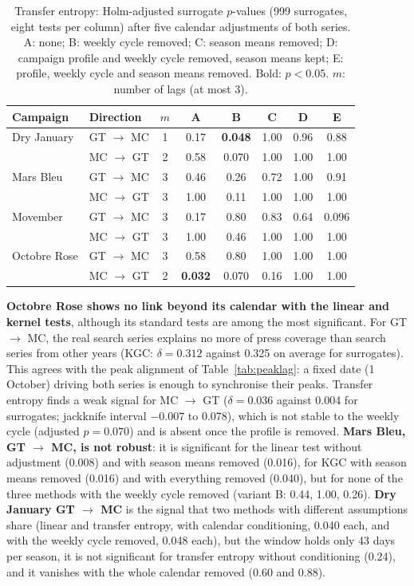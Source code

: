 \documentclass[11pt,a4paper]{article}
\begin{document}
\begin{table}[htbp]
\centering
\caption{Transfer entropy: Holm-adjusted surrogate $p$-values (999 surrogates, eight tests per column) after five calendar adjustments of both series. A: none; B: weekly cycle removed; C: season means removed; D: campaign profile and weekly cycle removed, season means kept; E: profile, weekly cycle and season means removed. Bold: $p<0.05$. $m$: number of lags (at most 3).}
\label{tab:adjust}
\small
\begin{tabular}{llcccccc}
\toprule
Campaign & Direction & $m$ & A & B & C & D & E \\
\midrule
Dry January & GT $\to$ MC & 1 & 0.17 & \textbf{0.048} & 1.00 & 0.96 & 0.88 \\
 & MC $\to$ GT & 2 & 0.58 & 0.070 & 1.00 & 1.00 & 1.00 \\
Mars Bleu & GT $\to$ MC & 3 & 0.46 & 0.26 & 0.72 & 1.00 & 0.91 \\
 & MC $\to$ GT & 3 & 1.00 & 0.11 & 1.00 & 1.00 & 1.00 \\
Movember & GT $\to$ MC & 3 & 0.17 & 0.80 & 0.83 & 0.64 & 0.096 \\
 & MC $\to$ GT & 3 & 1.00 & 0.46 & 1.00 & 1.00 & 1.00 \\
Octobre Rose & GT $\to$ MC & 3 & 0.58 & 0.80 & 1.00 & 1.00 & 1.00 \\
 & MC $\to$ GT & 2 & \textbf{0.032} & 0.070 & 0.16 & 1.00 & 1.00 \\
\bottomrule
\end{tabular}
\end{table}

\textbf{Octobre Rose shows no link beyond its calendar with the linear and kernel tests}, although its standard tests are among the most significant. For GT $\to$ MC, the real search series explains no more of press coverage than search series from other years (KGC: $\delta=0.312$ against 0.325 on average for surrogates). This agrees with the peak alignment of Table~\ref{tab:peaklag}: a fixed date (1 October) driving both series is enough to synchronise their peaks. Transfer entropy finds a weak signal for MC $\to$ GT ($\delta=0.036$ against 0.004 for surrogates; jackknife interval $-0.007$ to 0.078), which is not stable to the weekly cycle (adjusted $p=0.070$) and is absent once the profile is removed. \textbf{Mars Bleu, GT $\to$ MC, is not robust}: it is significant for the linear test without adjustment (0.008) and with season means removed (0.016), for KGC with season means removed (0.016) and with everything removed (0.040), but for none of the three methods with the weekly cycle removed (variant B: 0.44, 1.00, 0.26). \textbf{Dry January GT $\to$ MC} is the signal that two methods with different assumptions share (linear and transfer entropy, with calendar conditioning, 0.040 each, and with the weekly cycle removed, 0.048 each), but the window holds only 43 days per season, it is not significant for transfer entropy without conditioning (0.24), and it vanishes with the whole calendar removed (0.60 and 0.88).
\end{document}
